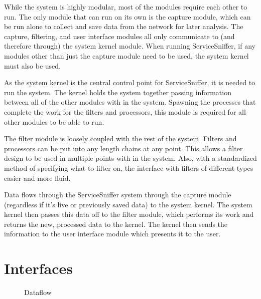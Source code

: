 \documentclass[titlepage]{article}
\begin{document}

While the system is highly modular, most of the modules require each other to
run.  The only module that can run on its own is the capture module, which can
be run alone to collect and save data from the network for later analysis.  The
capture, filtering, and user interface modules all only communicate to (and
therefore through) the system kernel module.  When running ServiceSniffer, if
any modules other than just the capture module need to be used, the system
kernel must also be used.  

As the system kernel is the central control point for ServiceSniffer, it is
needed to run the system. The kernel holds the system together passing
information between all of the other modules with in the system. Spawning the
processes that complete the work for the filters and processors, this module
is required for all other modules to be able to run.

The filter module is loosely coupled with the rest of the system. Filters and
processors can be put into any length chains at any point. This allows a filter
design to be used in multiple points with in the system. Also, with a
standardized method of specifying what to filter on, the interface with filters
of different types easier and more fluid.

Data flows through the ServiceSniffer system through the capture module
(regardless if it's live or previously saved data) to the system kernel.  The
system kernel then passes this data off to the filter module, which performs
its work and returns the new, processed data to the kernel.  The kernel then
sends the information to the user interface module which presents it to the
user.


\clearpage

\section{Interfaces
    \label{interfaces}
}

\begin{figure}
    \caption{Dataflow}
    \label{fig-dataflow}
\end{figure}

\end{document}
